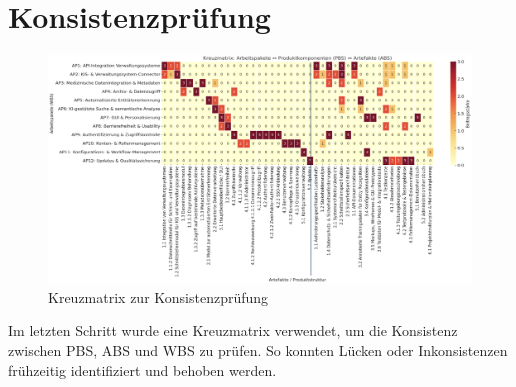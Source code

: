 \section{Konsistenzprüfung}
\begin{figure}[ht]
	\centering
	\includegraphics[width=1\textwidth]{fig/kreuzmatrix.png}
	\caption{Kreuzmatrix zur Konsistenzprüfung}
	\label{fig:kreuzmatrix}
\end{figure}
Im letzten Schritt wurde eine Kreuzmatrix verwendet, um die Konsistenz zwischen PBS, ABS und WBS zu prüfen. So konnten Lücken oder Inkonsistenzen frühzeitig identifiziert und behoben werden.



